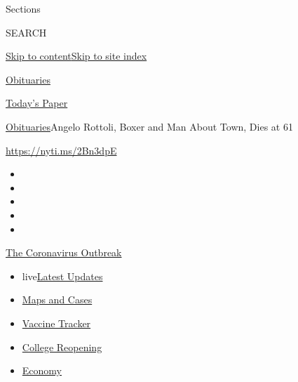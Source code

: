 Sections

SEARCH

\protect\hyperlink{site-content}{Skip to
content}\protect\hyperlink{site-index}{Skip to site index}

\href{https://www.nytimes.com/section/obituaries}{Obituaries}

\href{https://myaccount.nytimes.com/auth/login?response_type=cookie\&client_id=vi}{}

\href{https://www.nytimes.com/section/todayspaper}{Today's Paper}

\href{/section/obituaries}{Obituaries}\textbar{}Angelo Rottoli, Boxer
and Man About Town, Dies at 61

\url{https://nyti.ms/2Bn3dpE}

\begin{itemize}
\item
\item
\item
\item
\item
\end{itemize}

\href{https://www.nytimes.com/news-event/coronavirus?action=click\&pgtype=Article\&state=default\&region=TOP_BANNER\&context=storylines_menu}{The
Coronavirus Outbreak}

\begin{itemize}
\tightlist
\item
  live\href{https://www.nytimes.com/2020/08/03/world/coronavirus-covid-19.html?action=click\&pgtype=Article\&state=default\&region=TOP_BANNER\&context=storylines_menu}{Latest
  Updates}
\item
  \href{https://www.nytimes.com/interactive/2020/us/coronavirus-us-cases.html?action=click\&pgtype=Article\&state=default\&region=TOP_BANNER\&context=storylines_menu}{Maps
  and Cases}
\item
  \href{https://www.nytimes.com/interactive/2020/science/coronavirus-vaccine-tracker.html?action=click\&pgtype=Article\&state=default\&region=TOP_BANNER\&context=storylines_menu}{Vaccine
  Tracker}
\item
  \href{https://www.nytimes.com/2020/08/02/us/covid-college-reopening.html?action=click\&pgtype=Article\&state=default\&region=TOP_BANNER\&context=storylines_menu}{College
  Reopening}
\item
  \href{https://www.nytimes.com/live/2020/08/03/business/stock-market-today-coronavirus?action=click\&pgtype=Article\&state=default\&region=TOP_BANNER\&context=storylines_menu}{Economy}
\end{itemize}


